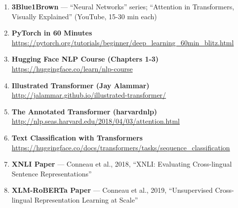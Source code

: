 \begin{enumerate}[nosep]
    \item \textbf{3Blue1Brown} --- ``Neural Networks'' series; ``Attention in Transformers, Visually Explained'' \hfill (YouTube, 15-30 min each)
    \item \textbf{PyTorch in 60 Minutes} \hfill \url{https://pytorch.org/tutorials/beginner/deep_learning_60min_blitz.html}
    \item \textbf{Hugging Face NLP Course (Chapters 1-3)} \hfill \url{https://huggingface.co/learn/nlp-course}
    \item \textbf{Illustrated Transformer (Jay Alammar)} \hfill \url{http://jalammar.github.io/illustrated-transformer/}
    \item \textbf{The Annotated Transformer (harvardnlp)} \hfill \url{http://nlp.seas.harvard.edu/2018/04/03/attention.html}
    \item \textbf{Text Classification with Transformers} \hfill \url{https://huggingface.co/docs/transformers/tasks/sequence_classification}
    \item \textbf{XNLI Paper} --- Conneau et al., 2018, ``XNLI: Evaluating Cross-lingual Sentence Representations''
    \item \textbf{XLM-RoBERTa Paper} --- Conneau et al., 2019, ``Unsupervised Cross-lingual Representation Learning at Scale''
\end{enumerate}
